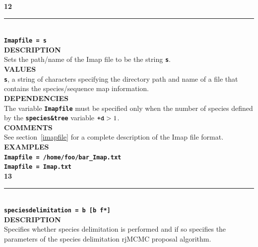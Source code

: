 \documentclass[a4paper]{book}
\numberwithin{equation}{section} \renewcommand{\baselinestretch}{0.55}
\begin{document}
\textbf{{\large 12}} \\
\noindent\rule{\textwidth}{0.8pt} \\
\textbf{{\Large \texttt{Imapfile = s}}} \vspace{5pt}\\
\textbf{DESCRIPTION} \vspace{5pt}\\
Sets the path/name of the Imap file to be the string \textbf{\texttt{s}}. \vspace{5pt}\\
\textbf{VALUES} \vspace{5pt}\\
\textbf{\texttt{s}}, a string of characters specifying the directory path and name of a file that contains the species/sequence map information. \vspace{5pt}\\
\textbf{DEPENDENCIES} \vspace{5pt}\\
The variable \textbf{\texttt{Imapfile}} must be specified only when the number of species defined by the \textbf{\texttt{species\&tree}} variable $\textbf{\texttt{+d}} > 1$. \vspace{5pt}\\
\textbf{COMMENTS} \vspace{5pt}\\
See section~\ref{imapfile} for a complete description of the Imap file format. \vspace{5pt} \\
\textbf{EXAMPLES} \vspace{5pt}\\
\textbf{\texttt{Imapfile = /home/foo/bar\_Imap.txt}} \vspace{5pt}\\
\textbf{\texttt{Imapfile = Imap.txt}} \vspace{10pt}\\
\textbf{{\large 13}} \\
\noindent\rule{\textwidth}{0.8pt} \\
\textbf{{\Large \texttt{speciesdelimitation = b [b f*]}}} \vspace{5pt}\\
\textbf{DESCRIPTION} \vspace{5pt}\\
Specifies whether species delimitation is performed and if so
specifies the parameters of the species delimitation rjMCMC proposal
algorithm. \vspace{5pt}\\
\end{document}
